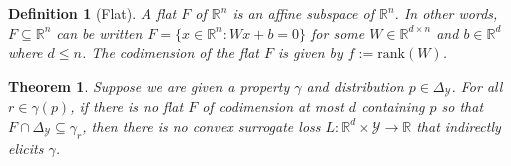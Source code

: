 \documentclass{article}
\newcommand{\reals}{\mathbb{R}}
\newcommand{\simplex}{\Delta_\Y}
\newcommand{\Y}{\mathcal{Y}}
\newtheorem{theorem}{Theorem}
\newtheorem{definition}{Definition}
\begin{document}
\begin{definition}[Flat]
	A \emph{flat} $F$ of $\reals^n$ is an affine subspace of $\reals^n$.
	In other words, $F\subseteq \reals^n$ can be written $F=\{x\in\reals^n : Wx + b = 0\}$ for some $W\in\reals^{d\times n}$ and $b\in\reals^d$ where $d\leq n$.
	The codimension of the flat $F$ is given by $f := \mathrm{rank}(W)$.
\end{definition}

\begin{theorem}\label{thm:cvx-flats}
	Suppose we are given a property $\gamma$ and distribution $p \in \simplex$.
	For all $r\in\gamma(p)$, if there is no flat $F$ of codimension at most $d$ containing $p$ so that $F \cap \simplex \subseteq \gamma_r$, then there is no convex surrogate loss $L : \reals^d \times \Y \to \reals$ that indirectly elicits $\gamma$.
\end{theorem}
\end{document}
